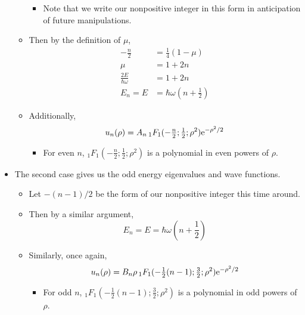 \documentclass[../finalProject.tex]{subfiles}
\begin{document}
\begin{itemize}
\begin{itemize}
\begin{itemize}
            \item Note that we write our nonpositive integer in this form in anticipation of future manipulations.
        \end{itemize}
        \item Then by the definition of $\mu$,
        \begin{align*}
            -\frac{n}{2} &= \frac{1}{4}(1-\mu)\\
            \mu &= 1+2n\\
            \frac{2E}{\hbar\omega} &= 1+2n\\
            E_n = E &= \hbar\omega\left( n+\frac{1}{2} \right)\tag{$n=0,2,4,\dots$}
        \end{align*}
        \item Additionally,
        \begin{equation*}
            u_n(\rho) = A_n\,{}_1F_1(-\tfrac{n}{2};\tfrac{1}{2};\rho^2)\e[-\rho^2/2]
        \end{equation*}
        \begin{itemize}
            \item For even $n$, ${}_1F_1(-\frac{n}{2};\frac{1}{2};\rho^2)$ is a polynomial in even powers of $\rho$.
        \end{itemize}
    \end{itemize}
    \item The second case gives us the odd energy eigenvalues and wave functions.
    \begin{itemize}
        \item Let $-(n-1)/2$ be the form of our nonpositive integer this time around.
        \item Then by a similar argument,
        \begin{equation*}
            E_n = E = \hbar\omega\left( n+\frac{1}{2} \right)\tag{$n=1,3,5,\dots$}
        \end{equation*}
        \item Similarly, once again,
        \begin{equation*}
            u_n(\rho) = B_n\rho\,{}_1F_1(-\tfrac{1}{2}(n-1);\tfrac{3}{2};\rho^2)\e[-\rho^2/2]
        \end{equation*}
        \begin{itemize}
            \item For odd $n$, ${}_1F_1(-\tfrac{1}{2}(n-1);\tfrac{3}{2};\rho^2)$ is a polynomial in odd powers of $\rho$.
        \end{itemize}
    \end{itemize}
\end{itemize}
\end{document}
